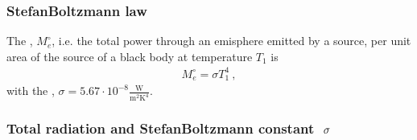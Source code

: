 \documentclass[letterpaper,10pt,english]{jupyterBook}
\begin{document}
\subsubsection{Stefan\sphinxhyphen{}Boltzmann law}
\label{\detokenize{ch/heat-transfer-radiation:stefan-boltzmann-law}}\label{\detokenize{ch/heat-transfer-radiation:classical-thermodynamics-heat-transmission-radiation-stefan-boltzmann}}
\sphinxAtStartPar
The , \(M_e^\circ\), \sphinxhyphen{} i.e. the total power through an emisphere emitted by a source, per unit area of the source \sphinxhyphen{} of a black body at temperature \(T_1\) is
\begin{equation*}
\begin{split}M_e^\circ = \sigma T_1^4 \ ,\end{split}
\end{equation*}
\sphinxAtStartPar
with the , \(\sigma = 5.67 \cdot 10^{-8} \frac{\text{W}}{\text{m}^2 \text{K}^4}\).
\subsubsection*{Total radiation and Stefan\sphinxhyphen{}Boltzmann constant \protect\(\ \sigma\protect\)}
\end{document}
